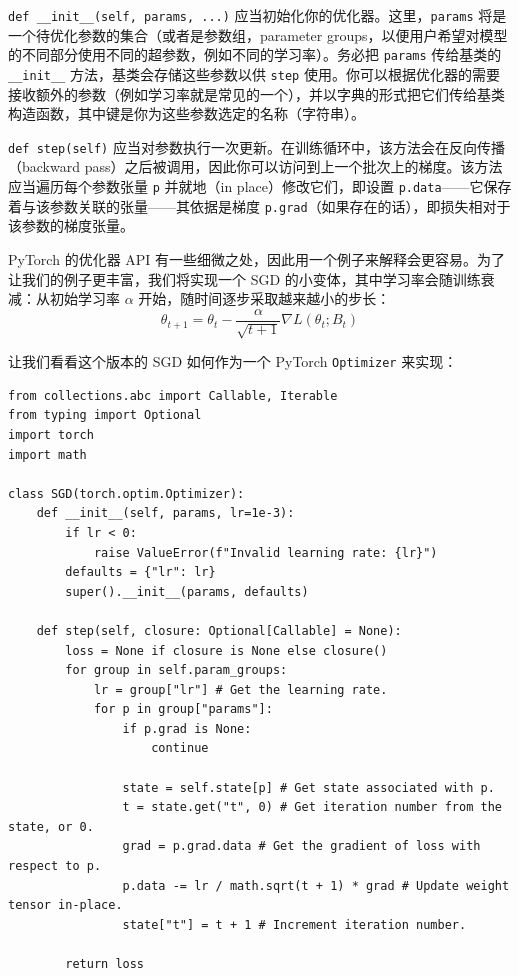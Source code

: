 \texttt{def \_\_init\_\_(self, params, ...)} 应当初始化你的优化器。这里，\texttt{params} 将是一个待优化参数的集合（或者是参数组，parameter groups，以便用户希望对模型的不同部分使用不同的超参数，例如不同的学习率）。务必把 \texttt{params} 传给基类的 \texttt{\_\_init\_\_} 方法，基类会存储这些参数以供 \texttt{step} 使用。你可以根据优化器的需要接收额外的参数（例如学习率就是常见的一个），并以字典的形式把它们传给基类构造函数，其中键是你为这些参数选定的名称（字符串）。

\texttt{def step(self)} 应当对参数执行一次更新。在训练循环中，该方法会在反向传播（backward pass）之后被调用，因此你可以访问到上一个批次上的梯度。该方法应当遍历每个参数张量 \texttt{p} 并就地（in place）修改它们，即设置 \texttt{p.data}——它保存着与该参数关联的张量——其依据是梯度 \texttt{p.grad}（如果存在的话），即损失相对于该参数的梯度张量。

PyTorch 的优化器 API 有一些细微之处，因此用一个例子来解释会更容易。为了让我们的例子更丰富，我们将实现一个 SGD 的小变体，其中学习率会随训练衰减：从初始学习率 $\alpha$ 开始，随时间逐步采取越来越小的步长：
\begin{equation*}
\theta_{t+1} = \theta_t - \frac{\alpha}{\sqrt{t+1}} \nabla L(\theta_t; B_t) \tag{20}
\end{equation*}

让我们看看这个版本的 SGD 如何作为一个 PyTorch \texttt{Optimizer} 来实现：

\begin{lstlisting}
from collections.abc import Callable, Iterable
from typing import Optional
import torch
import math

class SGD(torch.optim.Optimizer):
    def __init__(self, params, lr=1e-3):
        if lr < 0:
            raise ValueError(f"Invalid learning rate: {lr}")
        defaults = {"lr": lr}
        super().__init__(params, defaults)

    def step(self, closure: Optional[Callable] = None):
        loss = None if closure is None else closure()
        for group in self.param_groups:
            lr = group["lr"] # Get the learning rate.
            for p in group["params"]:
                if p.grad is None:
                    continue

                state = self.state[p] # Get state associated with p.
                t = state.get("t", 0) # Get iteration number from the state, or 0.
                grad = p.grad.data # Get the gradient of loss with respect to p.
                p.data -= lr / math.sqrt(t + 1) * grad # Update weight tensor in-place.
                state["t"] = t + 1 # Increment iteration number.

        return loss
\end{lstlisting}

